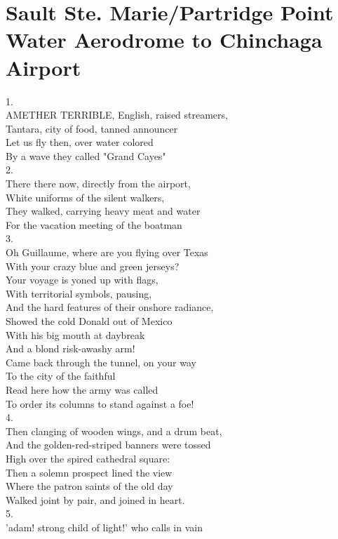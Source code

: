 \documentclass[smalldemyvopaper,11pt,twoside,onecolumn,openright,extrafontsizes]{memoir}
\begin{document}
\chapter{Sault Ste. Marie/Partridge Point Water Aerodrome to Chinchaga Airport}
1.
\\AMETHER TERRIBLE, English, raised streamers,
\\Tantara, city of food, tanned announcer
\\Let us fly then, over water colored
\\By a wave they called "Grand Cayes"
\\2.
\\There there now, directly from the airport,
\\White uniforms of the silent walkers,
\\They walked, carrying heavy meat and water
\\For the vacation meeting of the boatman
\\3.
\\Oh Guillaume, where are you flying over Texas
\\With your crazy blue and green jerseys?
\\Your voyage is yoned up with flags,
\\With territorial symbols, pausing,
\\And the hard features of their onshore radiance,
\\Showed the cold Donald out of Mexico
\\With his big mouth at daybreak
\\And a blond risk-awashy arm!
\\Came back through the tunnel, on your way
\\To the city of the faithful
\\Read here how the army was called
\\To order its columns to stand against a foe!
\\4.
\\Then clanging of wooden wings, and a drum beat,
\\And the golden-red-striped banners were tossed
\\High over the spired cathedral square:
\\Then a solemn prospect lined the view
\\Where the patron saints of the old day
\\Walked joint by pair, and joined in heart.
\\5.
\\'adam! strong child of light!' who calls in vain
\end{document}
